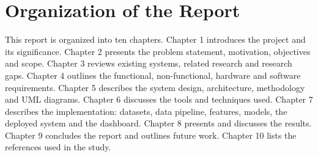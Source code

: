 \section{Organization of the Report}
\label{sec:organization}
This report is organized into ten chapters.
Chapter 1 introduces the project and its significance.
Chapter 2 presents the problem statement, motivation, objectives and scope.
Chapter 3 reviews existing systems, related research and research gaps.
Chapter 4 outlines the functional, non-functional, hardware and software requirements.
Chapter 5 describes the system design, architecture, methodology and UML diagrams.
Chapter 6 discusses the tools and techniques used.
Chapter 7 describes the implementation: datasets, data pipeline, features, models, the deployed system and the dashboard.
Chapter 8 presents and discusses the results.
Chapter 9 concludes the report and outlines future work.
Chapter 10 lists the references used in the study.
